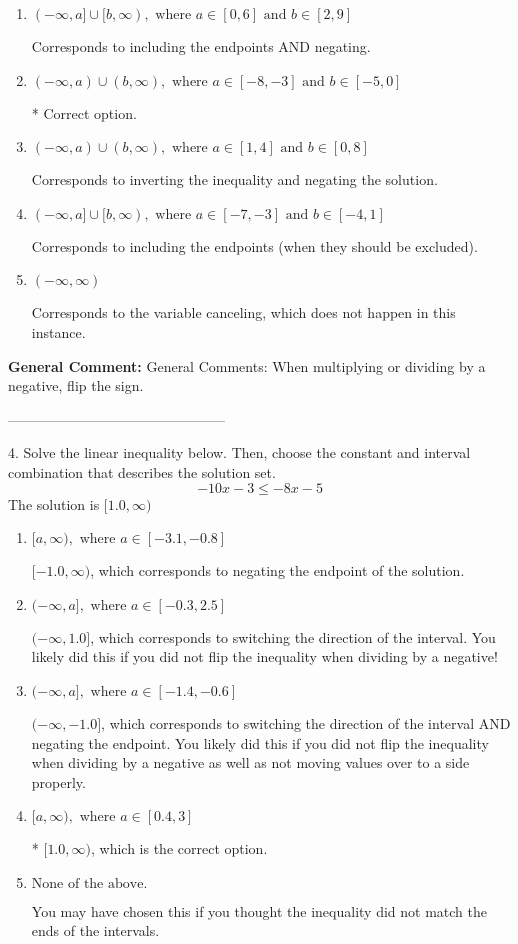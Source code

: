 \documentclass{extbook}[14pt]
\begin{document}
\begin{enumerate}[label=\Alph*.] 
\item $ (-\infty, a] \cup [b, \infty), \text{ where } a \in [0, 6] \text{ and } b \in [2, 9] $ 

 Corresponds to including the endpoints AND negating. 
\item $ (-\infty, a) \cup (b, \infty), \text{ where } a \in [-8, -3] \text{ and } b \in [-5, 0] $ 

  * Correct option. 
\item $ (-\infty, a) \cup (b, \infty), \text{ where } a \in [1, 4] \text{ and } b \in [0, 8] $ 

 Corresponds to inverting the inequality and negating the solution. 
\item $ (-\infty, a] \cup [b, \infty), \text{ where } a \in [-7, -3] \text{ and } b \in [-4, 1] $ 

 Corresponds to including the endpoints (when they should be excluded). 
\item $ (-\infty, \infty) $ 

 Corresponds to the variable canceling, which does not happen in this instance. 
\end{enumerate} 
 
\textbf{General Comment:} General Comments: When multiplying or dividing by a negative, flip the sign. 

-----------------------------------------------

4. Solve the linear inequality below. Then, choose the constant and interval combination that describes the solution set.
\[ -10x -3 \leq -8x -5 \] 
The solution is $ [1.0, \infty) $ 

\begin{enumerate}[label=\Alph*.] 
\item $ [a, \infty), \text{ where } a \in [-3.1, -0.8] $ 

  $[-1.0, \infty)$, which corresponds to negating the endpoint of the solution. 
\item $ (-\infty, a], \text{ where } a \in [-0.3, 2.5] $ 

  $(-\infty, 1.0]$, which corresponds to switching the direction of the interval. You likely did this if you did not flip the inequality when dividing by a negative! 
\item $ (-\infty, a], \text{ where } a \in [-1.4, -0.6] $ 

  $(-\infty, -1.0]$, which corresponds to switching the direction of the interval AND negating the endpoint. You likely did this if you did not flip the inequality when dividing by a negative as well as not moving values over to a side properly. 
\item $ [a, \infty), \text{ where } a \in [0.4, 3] $ 

 * $[1.0, \infty)$, which is the correct option. 
\item $ \text{None of the above}. $ 

 You may have chosen this if you thought the inequality did not match the ends of the intervals. 
\end{enumerate} 
 
\end{document}
